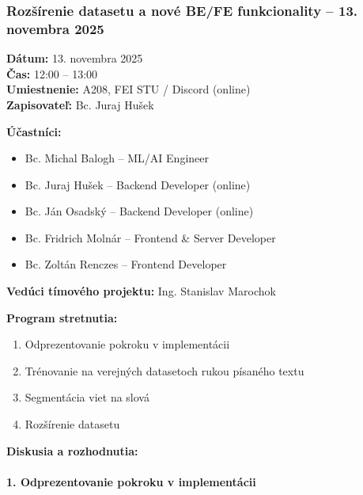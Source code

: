 \subsubsection{Rozšírenie datasetu a nové BE/FE funkcionality – 13. novembra 2025}

\textbf{Dátum:} 13. novembra 2025 \\
\textbf{Čas:} 12:00 – 13:00 \\
\textbf{Umiestnenie:} A208, FEI STU / Discord (online) \\
\textbf{Zapisovateľ:} Bc. Juraj Hušek

\vspace{0.5cm}
\textbf{Účastníci:}
\begin{itemize}
    \item Bc. Michal Balogh – ML/AI Engineer
    \item Bc. Juraj Hušek – Backend Developer (online)
    \item Bc. Ján Osadský – Backend Developer (online)
    \item Bc. Fridrich Molnár – Frontend \& Server Developer
    \item Bc. Zoltán Renczes – Frontend Developer
\end{itemize}

\textbf{Vedúci tímového projektu:} Ing. Stanislav Marochok

\vspace{0.5cm}
\textbf{Program stretnutia:}
\begin{enumerate}
    \item Odprezentovanie pokroku v implementácii
    \item Trénovanie na verejných datasetoch rukou písaného textu
    \item Segmentácia viet na slová
    \item Rozšírenie datasetu
\end{enumerate}

\vspace{0.5cm}
\textbf{Diskusia a rozhodnutia:}

\paragraph{1. Odprezentovanie pokroku v implementácii}

